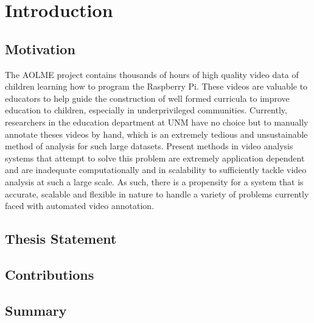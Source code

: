 \chapter{Introduction}
\section{\label{section:motivation}Motivation}
The AOLME project contains thousands of hours of high quality video data of
children learning how to program the Raspberry Pi. These videos are valuable to
educators to help guide the construction of well formed curricula to  improve
education to children, especially in underprivileged communities. Currently,
researchers in the education department at UNM have no choice but to manually
annotate theses videos by hand, which is an extremely tedious and unsustainable
method of analysis for such large datasets. Present methods in video analysis
systems that attempt to solve this problem are extremely application dependent
and are inadequate computationally and in scalability to sufficiently tackle
video analysis at such a large scale. As such, there is a propensity for a
system that is accurate, scalable and flexible in nature to handle a variety of
problems currently faced with automated video annotation.

\section{\label{section:thesis_statement}Thesis Statement}
\section{\label{section:contributions}Contributions}
\section{\label{section:summary}Summary}
